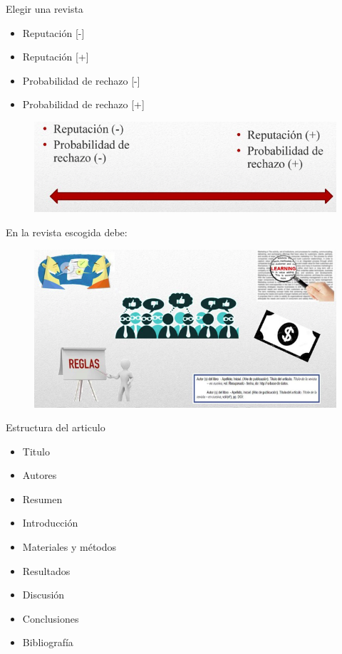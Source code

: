 \begin{frame}{Elegir una revista}
\begin{block}{}
\begin{itemize}
    \item Reputación [-]
    \item Reputación [+]
    \item Probabilidad de rechazo [-]
    \item Probabilidad de rechazo [+]
\end{itemize}
\end{block} 
\begin{figure}[H]
    \includegraphics[scale=0.5]{capitulos/paso1.png}
    \label{fig:boat1}
\end{figure}
\end{frame}

\begin{frame}{En la revista escogida debe: }
\begin{figure}[H]
    \includegraphics[scale=0.5]{capitulos/paso2.png}
    \label{fig:boat1}
\end{figure}
\end{frame}

\begin{frame}{Estructura del articulo}
\begin{block}{}
\begin{itemize}
    \item Titulo 
    \item Autores
    \item Resumen
    \item Introducción
    \item Materiales y métodos
    \item Resultados
    \item Discusión 
    \item Conclusiones
    \item Bibliografía
\end{itemize}
\end{block}   
\end{frame}


